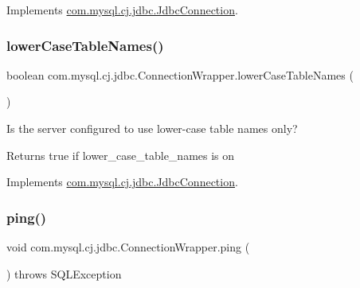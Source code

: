 Implements \mbox{\hyperlink{interfacecom_1_1mysql_1_1cj_1_1jdbc_1_1_jdbc_connection_a4418f89cdbd768f892b6ef7823107921}{com.\+mysql.\+cj.\+jdbc.\+Jdbc\+Connection}}.

\mbox{\label{classcom_1_1mysql_1_1cj_1_1jdbc_1_1_connection_wrapper_aba2642633d16efa8be0fd109c0fa9747}} 
\subsubsection{\texorpdfstring{lower\+Case\+Table\+Names()}{lowerCaseTableNames()}}
{\footnotesize\ttfamily boolean com.\+mysql.\+cj.\+jdbc.\+Connection\+Wrapper.\+lower\+Case\+Table\+Names (\begin{DoxyParamCaption}{ }\end{DoxyParamCaption})}

Is the server configured to use lower-\/case table names only?

\begin{DoxyReturn}{Returns}
true if lower\+\_\+case\+\_\+table\+\_\+names is \textquotesingle{}on\textquotesingle{} 
\end{DoxyReturn}


Implements \mbox{\hyperlink{interfacecom_1_1mysql_1_1cj_1_1jdbc_1_1_jdbc_connection_a54cca6407a1a531b8e65ee3d965a51cd}{com.\+mysql.\+cj.\+jdbc.\+Jdbc\+Connection}}.

\mbox{\label{classcom_1_1mysql_1_1cj_1_1jdbc_1_1_connection_wrapper_af9d635c00b09fc14bff63eeeec9b354d}} 
\subsubsection{\texorpdfstring{ping()}{ping()}}
{\footnotesize\ttfamily void com.\+mysql.\+cj.\+jdbc.\+Connection\+Wrapper.\+ping (\begin{DoxyParamCaption}{ }\end{DoxyParamCaption}) throws S\+Q\+L\+Exception}

